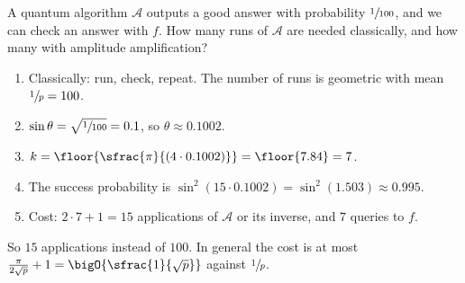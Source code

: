 \begin{exercisebox}
\begin{pproblem}[$p = 1/100$]\label{pp:amp100}
    A quantum algorithm $\mathcal{A}$ outputs a good answer with probability $\sfrac{1}{100}$, and we
    can check an answer with $f$. How many runs of $\mathcal{A}$ are needed classically, and how
    many with amplitude amplification?
\end{pproblem}
\tcblower
\begin{wsolution}
    \leavevmode
    \begin{enumerate}
        \item Classically: run, check, repeat. The number of runs is geometric with mean
              $\sfrac{1}{p} = 100$.
        \item $\sin\theta = \sqrt{\sfrac{1}{100}} = 0.1$, so $\theta \approx 0.1002$.
        \item $k = \floor{\sfrac{\pi}{(4 \cdot 0.1002)}} = \floor{7.84} = 7$.
        \item The success probability is $\sin^2(15 \cdot 0.1002) = \sin^2(1.503) \approx 0.995$.
        \item Cost: $2 \cdot 7 + 1 = 15$ applications of $\mathcal{A}$ or its inverse, and $7$
              queries to $f$.
    \end{enumerate}
    So $15$ applications instead of $100$. In general the cost is at most
    $\frac{\pi}{2\sqrt{p}} + 1 = \bigO{\sfrac{1}{\sqrt{p}}}$ against $\sfrac{1}{p}$.
\end{wsolution}
\end{exercisebox}
